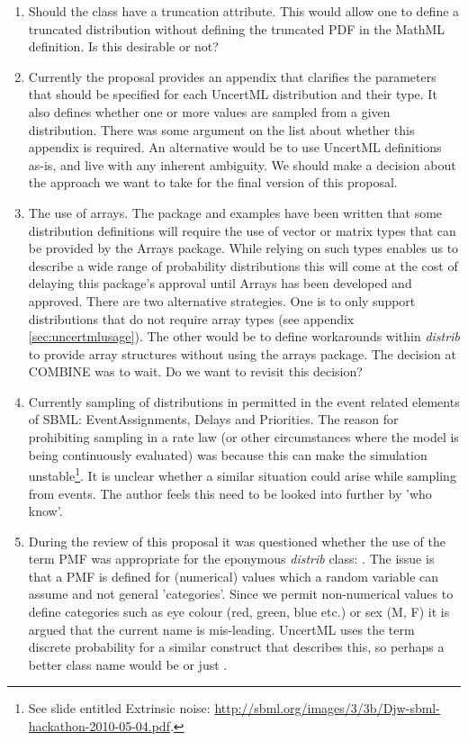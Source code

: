 \documentclass[draftspec]{sbmlpkgspec}
\newcommand{\distribshort}{\emph{distrib}\xspace}
\newcommand{\mathml}{MathML\xspace}
\newcommand{\uncertml}{UncertML\xspace}
\begin{document}
\begin{enumerate}
\item Should the  class have a truncation
  attribute. This would allow one to define a truncated distribution
  without defining the truncated PDF in the \mathml definition. Is
  this desirable or not?
\item Currently the proposal provides an appendix that clarifies the
  parameters that should be specified for each \uncertml distribution and their
  type. It also defines whether one or more values are sampled from a
  given distribution. There was some argument on the list about
  whether this appendix is required. An alternative would be to use
  \uncertml definitions as-is, and live with any inherent
  ambiguity. We should make a decision about the approach we want to
  take for the final version of this proposal.
\item The use of arrays. The package and examples have been written
  that some distribution definitions will require the use of vector or
  matrix types that can be provided by the Arrays package. While
  relying on such types enables us to describe a wide range of
  probability distributions this will come at the cost of delaying
  this package's approval until Arrays has been developed and
  approved. There are two alternative strategies. One is to only
  support distributions that do not require array types (see appendix
  \ref{sec:uncertmlusage}). The other would be to define workarounds
  within \distribshort to provide array structures without using the
  arrays package. The decision at COMBINE was to wait. Do we want to
  revisit this decision?
\item Currently sampling of distributions in permitted in the event
  related elements of SBML: EventAssignments, Delays and
Priorities. The reason for prohibiting sampling in a rate law (or other
circumstances where the model is being continuously evaluated) was
because this can make the simulation unstable\footnote{See slide entitled Extrinsic
  noise:
  \url{http://sbml.org/images/3/3b/Djw-sbml-hackathon-2010-05-04.pdf}.}. It
is unclear whether a similar situation could arise while sampling from
events. The author feels this need to be looked into further by 'who
know'.

\item During the review of this proposal it was questioned whether the
  use of the term PMF was appropriate for the eponymous \distribshort
  class: . The issue is that a PMF is defined
  for (numerical) values which a random variable can assume and not
  general 'categories'. Since we permit non-numerical values to define
  categories such as eye colour (red, green, blue etc.) or sex (M, F)
  it is argued that the current name is mis-leading. \uncertml uses
  the term discrete probability for a similar construct that describes
  this, so perhaps a better class name would be
   or just
  .


\end{enumerate}
\end{document}
